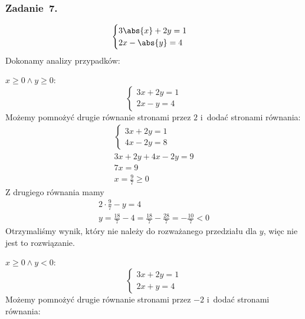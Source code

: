 \subsubsection*{Zadanie~7.}
\begin{equation*}
    \begin{cases}
        3\abs{x} + 2y = 1\\
        2x - \abs{y} = 4
    \end{cases}
\end{equation*}
Dokonamy analizy przypadków:
\begin{proofcases}
    \item \(x \geq 0 \land y \geq 0\):
        \begin{equation*}
            \begin{cases}
                3x + 2y = 1\\
                2x - y = 4
            \end{cases}
        \end{equation*}
        Możemy pomnożyć drugie równanie stronami przez \(2\) i~dodać stronami równania:
        \begin{gather*}
            \begin{cases}
                3x + 2y = 1\\
                4x - 2y = 8
            \end{cases}\\
            3x + 2y + 4x - 2y = 9\\
            7x = 9\\
            x = \frac{9}{7} \geq 0
        \end{gather*}
        Z drugiego równania mamy
        \begin{gather*}
            2 \cdot \frac{9}{7} - y = 4\\
            y = \frac{18}{7} - 4 = \frac{18}{7} - \frac{28}{7} = -\frac{10}{7} < 0
        \end{gather*}
        Otrzymaliśmy wynik, który nie należy do rozważanego przedziału dla \(y\), więc nie jest to rozwiązanie.
    \item \(x \geq 0 \land y < 0\):
        \begin{equation*}
            \begin{cases}
                3x + 2y = 1\\
                2x + y = 4
            \end{cases}
        \end{equation*}
        Możemy pomnożyć drugie równanie stronami przez \(-2\) i~dodać stronami równania:

\end{proofcases}
